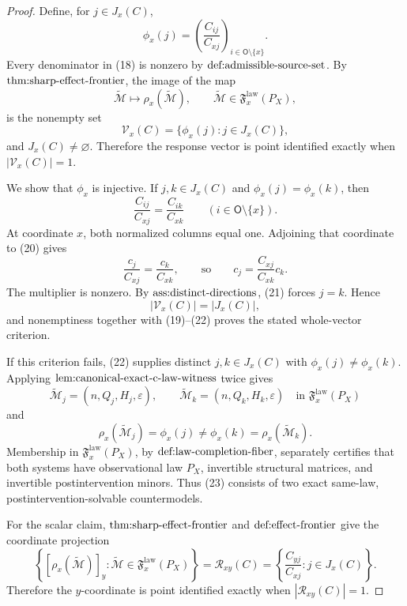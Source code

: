 \documentclass{article}
\begin{document}
\begin{proof}
Define, for \(j\in J_x(C)\),
\[
 \phi_x(j)=
 \left(\frac{C_{ij}}{C_{xj}}\right)_{i\in\mathsf O\setminus\{x\}}.
                                                                            \tag{18}
\]
Every denominator in (18) is nonzero by \(\textnormal{def:admissible-source-set}\).  By \(\textnormal{thm:sharp-effect-frontier}\), the image of the map
\[
 \widetilde{\mathcal M}\longmapsto\rho_x(\widetilde{\mathcal M}),
 \qquad
 \widetilde{\mathcal M}\in\mathfrak F_x^{\mathrm{law}}(P_X),
\]
is the nonempty set
\[
 \mathcal V_x(C)=\{\phi_x(j):j\in J_x(C)\},                                 \tag{19}
\]
and \(J_x(C)\ne\varnothing\).  Therefore the response vector is point identified exactly when \(|\mathcal V_x(C)|=1\).

We show that \(\phi_x\) is injective.  If \(j,k\in J_x(C)\) and
\(\phi_x(j)=\phi_x(k)\), then
\[
 \frac{C_{ij}}{C_{xj}}=\frac{C_{ik}}{C_{xk}}
 \qquad(i\in\mathsf O\setminus\{x\}).                                      \tag{20}
\]
At coordinate \(x\), both normalized columns equal one.  Adjoining that coordinate to (20) gives
\[
 \frac{c_j}{C_{xj}}=\frac{c_k}{C_{xk}},
 \qquad\text{so}\qquad
 c_j=\frac{C_{xj}}{C_{xk}}c_k.                                             \tag{21}
\]
The multiplier is nonzero.  By \(\textnormal{ass:distinct-directions}\), (21) forces \(j=k\).  Hence
\[
 |\mathcal V_x(C)|=|J_x(C)|,                                                \tag{22}
\]
and nonemptiness together with (19)--(22) proves the stated whole-vector criterion.

If this criterion fails, (22) supplies distinct \(j,k\in J_x(C)\) with
\(\phi_x(j)\ne\phi_x(k)\).  Applying
\(\textnormal{lem:canonical-exact-c-law-witness}\) twice gives
\[
 \widetilde{\mathcal M}_j=(n,Q_j,H_j,\varepsilon),\qquad
 \widetilde{\mathcal M}_k=(n,Q_k,H_k,\varepsilon)
 \quad\text{in }\mathfrak F_x^{\mathrm{law}}(P_X)
\]
and
\[
 \rho_x(\widetilde{\mathcal M}_j)=\phi_x(j)
 \ne\phi_x(k)=\rho_x(\widetilde{\mathcal M}_k).                             \tag{23}
\]
Membership in \(\mathfrak F_x^{\mathrm{law}}(P_X)\), by
\(\textnormal{def:law-completion-fiber}\), separately certifies that both systems have observational law \(P_X\), invertible structural matrices, and invertible postintervention minors.  Thus (23) consists of two exact same-law, postintervention-solvable countermodels.

For the scalar claim, \(\textnormal{thm:sharp-effect-frontier}\) and
\(\textnormal{def:effect-frontier}\) give the coordinate projection
\[
 \left\{[\rho_x(\widetilde{\mathcal M})]_y:
 \widetilde{\mathcal M}\in\mathfrak F_x^{\mathrm{law}}(P_X)\right\}
 =\mathcal R_{xy}(C)
 =\left\{\frac{C_{yj}}{C_{xj}}:j\in J_x(C)\right\}.                         \tag{24}
\]
Therefore the \(y\)-coordinate is point identified exactly when
\(|\mathcal R_{xy}(C)|=1\).


\end{proof}
\end{document}

